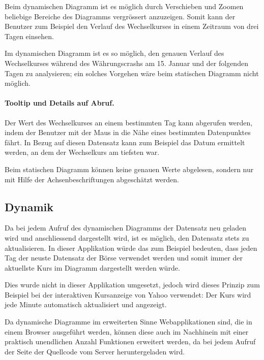 Beim dynamischen Diagramm ist es möglich durch Verschieben und Zoomen beliebige Bereiche des Diagramms vergrössert anzuzeigen. Somit kann der Benutzer zum Beispiel den Verlauf des Wechselkurses in einem Zeitraum von drei Tagen einsehen.

Im dynamischen Diagramm ist es so möglich, den genauen Verlauf des Wechselkurses während des Währungscrashs am 15. Januar und der folgenden Tagen zu analysieren; ein solches Vorgehen wäre beim statischen Diagramm nicht möglich.

\paragraph{Tooltip und Details auf Abruf.} 

Der Wert des Wechselkurses an einem bestimmten Tag kann abgerufen werden, indem der Benutzer mit der Maus in die Nähe eines bestimmten Datenpunktes fährt. In Bezug auf diesen Datensatz kann zum Beispiel das Datum ermittelt werden, an dem der Wechselkurs am tiefsten war.

Beim statischen Diagramm können keine genauen Werte abgelesen, sondern nur mit Hilfe der Achsenbeschriftungen abgeschätzt werden.
\newpage
\subsection{Dynamik}

Da bei jedem Aufruf des dynamischen Diagramms der Datensatz neu geladen wird und anschliessend dargestellt wird, ist es möglich, den Datensatz stets zu aktualisieren. In dieser Applikation würde das zum Beispiel bedeuten, dass jeden Tag der neuste Datensatz der Börse verwendet werden und somit immer der aktuellste Kurs im Diagramm dargestellt werden würde.

Dies wurde nicht in dieser Applikation umgesetzt, jedoch wird dieses Prinzip zum Beispiel bei der interaktiven Kursanzeige von Yahoo \cite{yahoo} verwendet: Der Kurs wird jede Minute automatisch aktualisiert und angezeigt.

Da dynamische Diagramme im erweiterten Sinne Webapplikationen sind, die in einem Browser ausgeführt werden, können diese auch im Nachhinein mit einer praktisch unendlichen Anzahl Funktionen erweitert werden, da bei jedem Aufruf der Seite der Quellcode vom Server heruntergeladen wird.